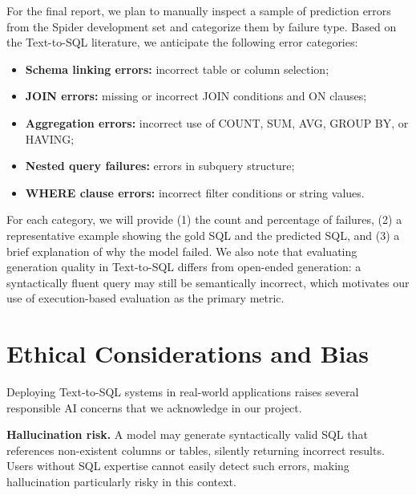 \documentclass[11pt,a4paper]{article}
\begin{document}

For the final report, we plan to manually inspect a sample of prediction
errors from the Spider development set and categorize them by failure type.
Based on the Text-to-SQL literature, we anticipate the following error categories:

\begin{itemize}[noitemsep]
  \item \textbf{Schema linking errors:} incorrect table or column selection;
  \item \textbf{JOIN errors:} missing or incorrect JOIN conditions and ON clauses;
  \item \textbf{Aggregation errors:} incorrect use of COUNT, SUM, AVG, GROUP BY,
        or HAVING;
  \item \textbf{Nested query failures:} errors in subquery structure;
  \item \textbf{WHERE clause errors:} incorrect filter conditions or string values.
\end{itemize}

For each category, we will provide (1) the count and percentage of failures,
(2) a representative example showing the gold SQL and the predicted SQL,
and (3) a brief explanation of why the model failed.
We also note that evaluating generation quality in Text-to-SQL differs from
open-ended generation: a syntactically fluent query may still be semantically
incorrect, which motivates our use of execution-based evaluation as the
primary metric.


\section{Ethical Considerations and Bias}


Deploying Text-to-SQL systems in real-world applications raises several
responsible AI concerns that we acknowledge in our project.

\noindent\textbf{Hallucination risk.}
A model may generate syntactically valid SQL that references non-existent
columns or tables, silently returning incorrect results.
Users without SQL expertise cannot easily detect such errors, making
hallucination particularly risky in this context.
\end{document}
